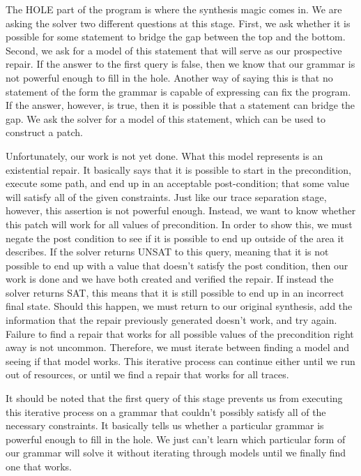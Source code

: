 \documentclass[]{article}
\begin{document}
The HOLE part of the program is where the synthesis magic comes in.  We are
asking the solver two different questions at this stage.  First, we
ask whether it is possible for some statement to bridge the gap between
the top and the bottom.  Second, we ask for a model of this statement that
will serve as our prospective repair.  If the answer to the first query is
false, then we know that our grammar is not powerful enough to fill in the
hole.  Another way of saying this is that no statement of the form the
grammar is capable of expressing can fix the program.  If the answer,
however, is true, then it is possible that a statement can bridge the gap.
We ask the solver for a model of this statement, which can be used to
construct a patch.

Unfortunately, our work is not yet done.  What this model represents is an
existential repair.  It basically says that it is possible to start in the
precondition, execute some path, and end up in an acceptable post-condition;
that some value will satisfy all of the given constraints.  Just like our
trace separation stage, however, this assertion is not powerful enough.
Instead, we want to know whether this patch will work for all values of
precondition.  In order to show this, we must negate the post condition to
see if it is possible to end up outside of the area it describes.  If the
solver returns UNSAT to this query, meaning that it is not possible to end
up with a value that doesn't satisfy the post condition, then our work is
done and we have both created and verified the repair.  If instead the
solver returns SAT, this means that it is still possible to end up in an
incorrect final state.  Should this happen, we must return to our original
synthesis, add the information that the repair previously generated doesn't
work, and try again.  Failure to find a repair that works for all possible
values of the precondition right away is not uncommon.  Therefore, we must
iterate between finding a model and seeing if that model works.  This
iterative process can continue either until we run out of resources, or
until we find a repair that works for all traces.

It should be noted that the first query of this stage prevents us from
executing this iterative process on a grammar that couldn't possibly satisfy
all of the necessary constraints.  It basically tells us whether a
particular grammar is powerful enough to fill in the hole.  We just can't
learn which particular form of our grammar will solve it without iterating
through models until we finally find one that works.
\end{document}

